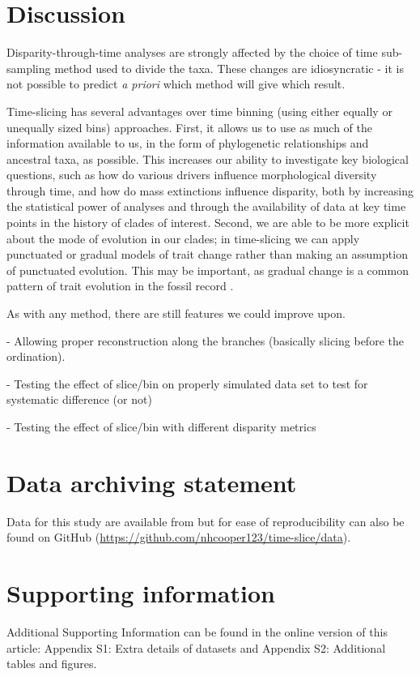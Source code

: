 \documentclass[12pt,a4paper]{article}
\begin{document}

\section{Discussion}
Disparity-through-time analyses are strongly affected by the choice of time sub-sampling method used to divide the taxa. 
These changes are idiosyncratic - it is not possible to predict \textit{a priori} which method will give which result. 

Time-slicing has several advantages over time binning (using either equally or unequally sized bins) approaches.
First, it allows us to use as much of the information available to us, in the form of phylogenetic relationships and ancestral taxa, as possible. 
This increases our ability to investigate key biological questions, such as how do various drivers influence morphological diversity through time, and how do mass extinctions influence disparity, both by increasing the statistical power of analyses and through the availability of data at key time points in the history of clades of interest.
Second, we are able to be more explicit about the mode of evolution in our clades; in time-slicing we can apply punctuated or gradual models of trait change rather than making an assumption of punctuated evolution.
This may be important, as gradual change is a common pattern of trait evolution in the fossil record \citep{Hunt20112007}.

As with any method, there are still features we could improve upon. 



  - Allowing proper reconstruction along the branches (basically slicing before the ordination).

  - Testing the effect of slice/bin on properly simulated data set to test for systematic difference (or not)

  - Testing the effect of slice/bin with different disparity metrics


\section{Data archiving statement}
Data for this study are available from \cite{dryad_n2g80,dryad_6hb7j,dryad_84t75,beckancient2014} but for ease of reproducibility can also be found on GitHub (\url{https://github.com/nhcooper123/time-slice/data}).

\section{Supporting information}
Additional Supporting Information can be found in the online version of this article:
Appendix S1: Extra details of datasets and Appendix S2: Additional tables and figures.
\end{document}
